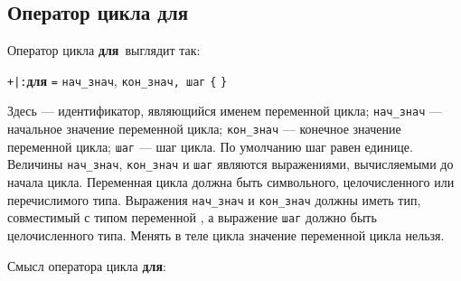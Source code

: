 \documentclass[10pt]{report}
\begin{document}
\subsection{Оператор цикла \glqq для\grqq}
Оператор цикла \textbf{\glqq для\grqq}\ выглядит так:
\begin{center}
	\rbo\texttt{+|}\texttt{:}\rbc\optional \textbf{для} \textcolor{Green}{} \texttt{=} \texttt{нач_знач}, \texttt{кон_знач}\rbo\texttt{, шаг}\rbc\optional
	\texttt{\{}\rbo{} \sor {}\rbc\kleene\texttt{\}}
\end{center}

Здесь \textcolor{Green}{} --- идентификатор, являющийся именем переменной цикла; \texttt{нач_знач} --- начальное значение переменной цикла;
\texttt{кон_знач} --- конечное значение переменной цикла; \texttt{шаг} --- шаг цикла. По умолчанию шаг равен единице. Величины \texttt{нач_знач}, \texttt{кон_знач} и
\texttt{шаг} являются выражениями, вычисляемыми до начала цикла. Переменная цикла должна быть символьного, целочисленного или перечислимого типа. Выражения \texttt{нач_знач} и
\texttt{кон_знач} должны иметь тип, совместимый с типом переменной \textcolor{Green}{}, а выражение \texttt{шаг} должно быть целочисленного типа.
Менять в теле цикла значение переменной цикла нельзя.

Смысл оператора цикла \textbf{\glqq для\grqq}:
\end{document}
